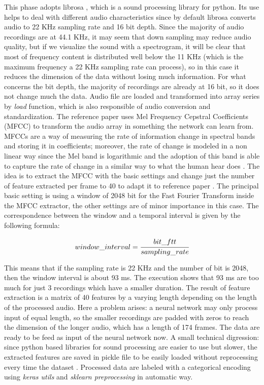\documentclass{article}
\begin{document}
This phase adopts librosa \cite{mcfee2015librosa}, which is a sound processing library for python. Its use helps to deal with different audio characteristics since by default librosa converts audio to 22 KHz sampling rate and 16 bit depth. Since the majority of audio recordings are at 44.1 KHz, it may seem that down sampling may reduce audio quality, but if we visualize the sound with a spectrogram, it will be clear that most of frequency content is distributed well below the 11 KHz (which is the maximum frequency a 22 KHz sampling rate can process), so in this case it reduces the dimension of the data without losing much information. For what concerns the bit depth, the majority of recordings are already at 16 bit, so it does not change much the data. Audio file are loaded and transformed into array series by \textit{load} function, which is also responsible of audio conversion and standardization.\newline
The reference paper \cite{drossos2020sound} uses Mel Frequency Cepstral Coefficients (MFCC) to transform the audio array in something the network can learn from. MFCCs are a way of measuring the rate of information change in spectral bands and storing it in coefficients; moreover, the rate of change is modeled in a non linear way since the Mel band is logarithmic and the adoption of this band is able to capture the rate of change in a similar way to what the human hear does \cite{MFCC}. \newline
The idea is to extract the MFCC with the basic settings and change just the number of feature extracted per frame to 40 to adapt it to reference paper \cite{drossos2020sound}. The principal basic setting is using a window of 2048 bit for the Fast Fourier Transform inside the MFCC extractor, the other settings are of minor importance in this case. The correspondence between the window and a temporal interval is given by the following formula: 
 
\begin{equation} \label{eq:window_interval}
	window\_interval = \cfrac{bit\_ftt}{sampling\_rate}
\end{equation}

This means that if the sampling rate is 22 KHz and the number of bit is 2048, then the window interval is about 93 ms. The execution shows that 93 ms are too much for just 3 recordings which have a smaller duration. The result of feature extraction is a matrix of 40 features by a varying length depending on the length of the processed audio. Here a problem arises: a neural network may only process input of equal length, so the smaller recordings are padded with zeros to reach the dimension of the longer audio, which has a length of 174 frames. The data are ready to be feed as input of the neural network now.\newline
A small technical digression: since python based libraries for sound processing are easier to use but slower, the extracted features are saved in pickle file to be easily loaded without reprocessing every time the dataset \cite{pickle}.\newline
Processed data are labeled with a categorical encoding using \textit{keras utils} and \textit{sklearn preprocessing} in automatic way.
\end{document}
